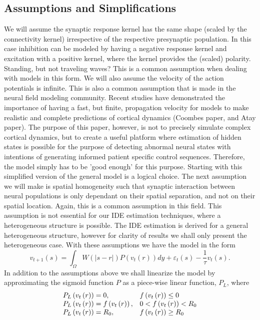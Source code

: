\documentclass[journal]{IEEEtran}
\begin{document}
\subsection{Assumptions and Simplifications}
We will assume the synaptic response kernel has the same shape (scaled by the connectivity kernel) irrespective of the respective presynaptic population. In this case inhibition can be modeled by having a negative response kernel and excitation with a positive kernel, where the kernel provides the (scaled) polarity. Standing, but not traveling waves? This is a common assumption when dealing with models in this form. We will also assume the velocity of the action potentials is infinite. This is also a common assumption that is made in the neural field modeling community. Recent studies have demonstrated the importance of having a fast, but finite, propagation velocity for models to make realistic and complete predictions of cortical dynamics (Coombes paper, and Atay paper). The purpose of this paper, however, is not to precisely simulate complex cortical dynamics, but to create a useful platform where estimation of hidden states is possible for the purpose of detecting abnormal neural states with intentions of generating informed patient specific control sequences. Therefore, the model simply has to be 'good enough' for this purpose. Starting with this simplified version of the general model is a logical choice. The next assumption we will make is spatial homogeneity such that synaptic interaction between neural populations is only dependant on their spatial separation, and not on their spatial location. Again, this is a common assumption in this field.  This assumption is not essential for our IDE estimation techniques, where a heterogeneous structure is possible. The IDE estimation is derived for a general heterogeneous structure, however for clarity of results we shall only present the heterogeneous case. With these assumptions we have the model in the form
\begin{equation}\label{Eq10}
{v_{t + 1}}\left( s \right) = \int_\Omega  {W\left( {\left| {s - r} \right|} \right)P\left( {{v_t}\left( r \right)} \right)dy}  + {\varepsilon _t}\left( s \right) - \frac{1}{\tau }{v_t}\left( s \right).
\end{equation}
In addition to the assumptions above we shall linearize the model by approximating the sigmoid function $P$ as a piece-wise linear function, $P_{L}$, where
\begin{equation}\label{Eq11}
\begin{array}{*{20}{c}}
   {{P_{L}}\left( {{v_t}\left( r \right)} \right) = 0,} \hfill & {f\left( {{v_t}\left( r \right)} \right) \le 0} \hfill  \\
   {{P_{L}}\left( {{v_t}\left( r \right)} \right) = f\left( {{v_t}\left( r \right)} \right),} \hfill & {0 < f\left( {{v_t}\left( r \right)} \right) < {R_0}} \hfill  \\
   {{P_{L}}\left( {{v_t}\left( r \right)} \right) = {R_0},} \hfill & {f\left( {{v_t}\left( r \right)} \right) \ge {R_0}} \hfill  \\
\end{array}
\end{equation}
\end{document}
